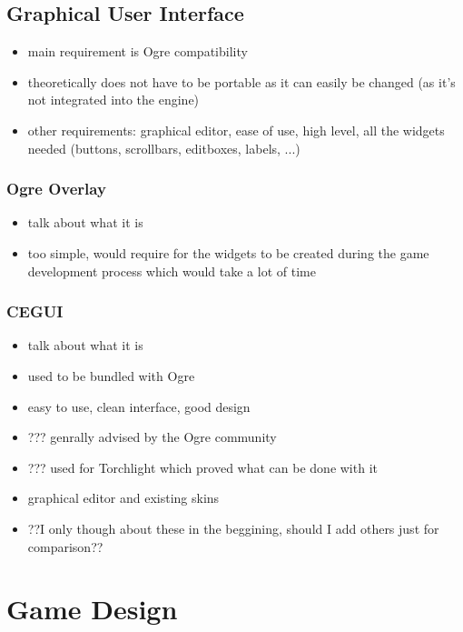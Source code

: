 \subsection{Graphical User Interface}

\begin{itemize}
    \item main requirement is Ogre compatibility
    \item theoretically does not have to be portable as it can easily be changed
        (as it's not integrated into the engine)
    \item other requirements: graphical editor, ease of use, high level, all the
        widgets needed (buttons, scrollbars, editboxes, labels, ...)

\end{itemize}

\subsubsection{Ogre Overlay}

\begin{itemize}
    \item talk about what it is
    \item too simple, would require for the widgets to be created during
        the game development process which would take a lot of time
\end{itemize}

\subsubsection{CEGUI}

\begin{itemize}
    \item talk about what it is
    \item used to be bundled with Ogre
    \item easy to use, clean interface, good design
    \item ??? genrally advised by the Ogre community
    \item ??? used for Torchlight which proved what can be done with it
    \item graphical editor and existing skins
    \item ??I only though about these in the beggining, should I add
        others just for comparison??
\end{itemize}

\section{Game Design}

